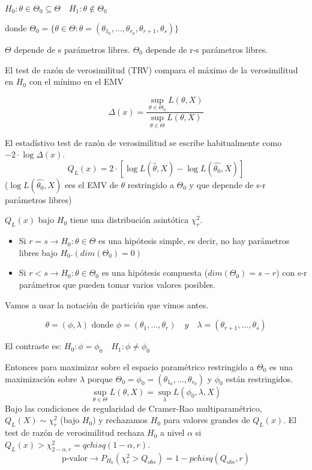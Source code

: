 \(
H_0: \theta \in \Theta_0 \subseteq \Theta \quad H_1: \theta \notin \Theta_0
\)

donde $\Theta_0=\{
    \theta \in \Theta: \theta=(\theta_{1_0},\dots,\theta_{r_0},\theta_{r+1},\theta_s)
\}$

$\Theta$ depende de s parámetros libres. $\Theta_0$ depende de r-s parámetros libres.

El test de razón de verosimilitud (TRV) compara el máximo de la verosimilitud en $H_0$ con el mínimo en el EMV

\[
\Delta(x)=\frac{\sup_{\theta \in \Theta_0} L(\theta,X)}{\sup_{\theta \in \Theta} L(\theta,X)}
\]

El estadístivo test de razón de verosimilitud se escribe habitualmente como $-2 \cdot \log \Delta(x)$.
\[
Q_L(x)=2 \cdot [\log L(\hat{\theta},X)-\log L(\hat{\theta_0},X)]
\]
($\log L(\hat{\theta_0},X)$ ees el EMV de $\theta$ restringido a $\Theta_0$ y que depende de s-r parámetros libres)

$Q_L(x)$ bajo $H_0$ tiene una distribución asintótica $\chi^2_r$.
\begin{itemize}
    \item Si $r=s \to H_0:\theta \in \Theta$ es una hipótesis simple, es decir, no hay parámetros libres bajo $H_0.(dim(\Theta_0)=0)$
    \item Si $r<s \to H_0:\theta \in \Theta_0$ es una hipótesis compuesta ($dim(\Theta_0)=s-r$) con s-r parámetros que pueden tomar varios valores posibles.
\end{itemize}

Vamos a usar la notación de partición que vimos antes.

\[
\theta=(\phi,\lambda) \text{ donde } \phi=(\theta_1,\dots,\theta_r) \quad y \quad \lambda=(\theta_{r+1},\dots,\theta_s)
\]

El contraste es: $H_0:\phi=\phi_0 \quad H_1:\phi \neq \phi_0$

Entonces para maximizar sobre el espacio paramétrico restringido a $\Theta_0$ es una maximización sobre $\lambda$ porque
$\Theta_0=\phi_0=(\theta_{1_0},\dots,\theta_{r_0})$ y $\phi_0$ están restringidos.
$$\sup_{\theta \in \Theta}L(\theta,X)=\sup_\lambda L(\phi_0,\lambda,X)$$
\newpage
Bajo las condiciones de regularidad de Cramer-Rao multiparamétrico, 
$Q_L(X) \sim \chi^2_r$ (bajo $H_0$)
y rechazamos $H_0$ para valores grandes de $Q_L(x)$. El test de razón de verosimilitud rechaza $H_0$ a nivel $\alpha$ si $Q_L(x)>\chi^2_{2-\alpha,r}=qchisq(1-\alpha,r)$.
\[
\text{p-valor} \to P_{H_0}(\chi^2_r>Q_{obs})=1-pchisq(Q_{obs},r)
\]
